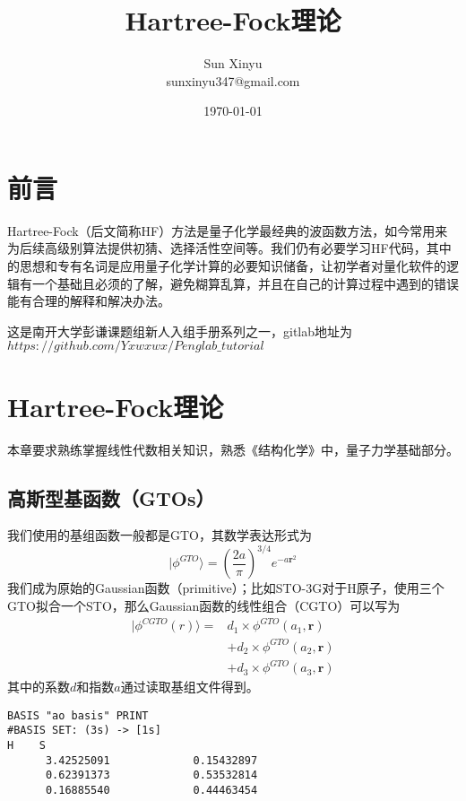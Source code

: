 \documentclass[12pt, a4paper, oneside]{ctexart}
\title{\textbf{Hartree-Fock理论}}
\author{Sun Xinyu\\sunxinyu347@gmail.com}
\date{\today}
\begin{document}
\maketitle

\setcounter{page}{0}
\maketitle
\thispagestyle{empty}

\newpage
{}
\setcounter{page}{1}
\tableofcontents
\newpage
\setcounter{page}{1}

\section{前言}

  Hartree-Fock（后文简称HF）方法是量子化学最经典的波函数方法，如今常用来为后续高级别算法提供初猜、选择活性空间等。我们仍有必要学习HF代码，其中的思想和专有名词是应用量子化学计算的必要知识储备，让初学者对量化软件的逻辑有一个基础且必须的了解，避免糊算乱算，并且在自己的计算过程中遇到的错误能有合理的解释和解决办法。\par
这是南开大学彭谦课题组新人入组手册系列之一，gitlab地址为$https://github.com/Yxwxwx/Penglab\_tutorial$
\newpage

\section{Hartree-Fock理论}
本章要求熟练掌握线性代数相关知识，熟悉《结构化学》中，量子力学基础部分。

\subsection{高斯型基函数（GTOs）}
  我们使用的基组函数一般都是GTO，其数学表达形式为$$|\phi^{GTO}\rangle=\left(\frac{2a}{\pi}\right)^{3/4}e^{-a{\bm{r}}^2}$$我们成为原始的Gaussian函数（primitive）；比如STO-3G对于H原子，使用三个GTO拟合一个STO，那么Gaussian函数的线性组合（CGTO）可以写为
\begin{equation}
\begin{aligned}
    |\phi^{CGTO}(r)\rangle=&d_1\times\phi^{GTO}(a_1,\bm{r}) \\
    &+d_2\times\phi^{GTO}(a_2,\bm{r}) \\
    &+d_3\times\phi^{GTO}(a_3,\bm{r})\nonumber
\end{aligned}
\end{equation}
其中的系数$d$和指数$a$通过读取基组文件得到。
\begin{verbatim}
BASIS "ao basis" PRINT
#BASIS SET: (3s) -> [1s]
H    S
      3.42525091             0.15432897       
      0.62391373             0.53532814       
      0.16885540             0.44463454     
\end{verbatim}
\end{document}
